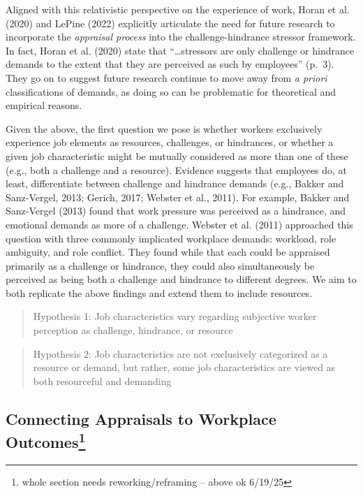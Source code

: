 \documentclass[
  man]{apa7}
\begin{document}
Aligned with this relativistic perspective on the experience of work, Horan et al. (2020) and LePine (2022) explicitly articulate the need for future research to incorporate the \emph{appraisal process} into the challenge-hindrance stressor framework. In fact, Horan et al. (2020) state that ``\ldots stressors are only challenge or hindrance demands to the extent that they are perceived as such by employees'' (p.~3). They go on to suggest future research continue to move away from \emph{a priori} classifications of demands, as doing so can be problematic for theoretical and empirical reasons.

Given the above, the first question we pose is whether workers exclusively experience job elements as resources, challenges, or hindrances, or whether a given job characteristic might be mutually considered as more than one of these (e.g., both a challenge and a resource). Evidence suggests that employees do, at least, differentiate between challenge and hindrance demands (e.g., Bakker and Sanz-Vergel, 2013; Gerich, 2017; Webster et al., 2011). For example, Bakker and Sanz-Vergel (2013) found that work pressure was perceived as a hindrance, and emotional demands as more of a challenge. Webster et al. (2011) approached this question with three commonly implicated workplace demands: workload, role ambiguity, and role conflict. They found while that each could be appraised primarily as a challenge or hindrance, they could also simultaneously be perceived as being both a challenge and hindrance to different degrees. We aim to both replicate the above findings and extend them to include resources.

\begin{quote}
Hypothesis 1: Job characteristics vary regarding subjective worker perception as challenge, hindrance, or resource
\end{quote}

\begin{quote}
Hypothesis 2: Job characteristics are not exclusively categorized as a resource or demand, but rather, some job characteristics are viewed as both resourceful and demanding
\end{quote}

\hypertarget{connecting-appraisals-to-workplace-outcomes}{%
\subsection[Connecting Appraisals to Workplace Outcomes]{\texorpdfstring{Connecting Appraisals to Workplace Outcomes\footnote{whole section needs reworking/reframing -- above ok 6/19/25}}{Connecting Appraisals to Workplace Outcomes}}\label{connecting-appraisals-to-workplace-outcomes}}
\end{document}
